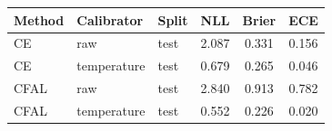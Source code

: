 \begin{tabular}{lllccc}
\toprule
Method & Calibrator & Split & NLL & Brier & ECE\\
\midrule
CE & raw & test & \num{2.087} & \num{0.331} & \num{0.156}\\
CE & temperature & test & \num{0.679} & \num{0.265} & \num{0.046}\\
CFAL & raw & test & \num{2.840} & \num{0.913} & \num{0.782}\\
CFAL & temperature & test & \num{0.552} & \num{0.226} & \num{0.020}\\
\bottomrule
\end{tabular}
